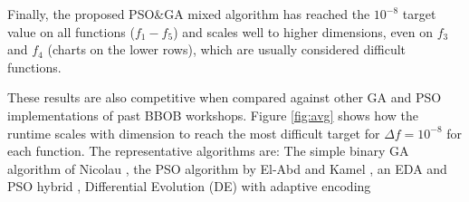 \documentclass[runningheads]{llncs}
\begin{document}
Finally, the proposed PSO\&GA mixed algorithm has reached the $10^{-8}$ target
value on all functions ($f_1-f_5$) and scales well to higher dimensions, even
on $f_3$ and $f_4$ (charts on the lower rows), which are usually considered difficult functions. 



These results are also competitive when compared against other GA and PSO
implementations of past BBOB workshops. Figure \ref{fig:avg} shows 
how the runtime scales with dimension to reach the most difficult target 
for $\Delta f = 10^{-8}$ for each function. 
The representative algorithms are:
The simple binary GA algorithm of Nicolau \cite{nicolau2009application},
the PSO algorithm by El-Abd and Kamel \cite{el2009black}, an EDA and PSO 
hybrid \cite{el2009blackHybrid}, Differential Evolution (DE) with adaptive encoding \cite{povsik2012benchmarking}
\end{document}
